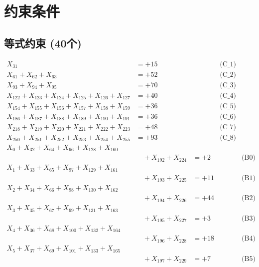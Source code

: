 \documentclass[a4paper,10pt]{article}
\begin{document}
\section{约束条件}

\subsection{等式约束 (40个)}

\allowdisplaybreaks
{\small
\begin{align}
X_{31} &= +15 && \text{(C\_1)} \\
X_{61} + X_{62} + X_{63} &= +52 && \text{(C\_2)} \\
X_{93} + X_{94} + X_{95} &= +70 && \text{(C\_3)} \\
X_{122} + X_{123} + X_{124} + X_{125} + X_{126} + X_{127} &= +40 && \text{(C\_4)} \\
X_{154} + X_{155} + X_{156} + X_{157} + X_{158} + X_{159} &= +36 && \text{(C\_5)} \\
\allowbreak
X_{186} + X_{187} + X_{188} + X_{189} + X_{190} + X_{191} &= +36 && \text{(C\_6)} \\
X_{218} + X_{219} + X_{220} + X_{221} + X_{222} + X_{223} &= +48 && \text{(C\_7)} \\
X_{250} + X_{251} + X_{252} + X_{253} + X_{254} + X_{255} &= +93 && \text{(C\_8)} \\
X_{0} + X_{32} + X_{64} + X_{96} + X_{128} + X_{160} \\[0.1ex]
&\quad  + X_{192} + X_{224} &= +2 && \text{(B0)} \\
X_{1} + X_{33} + X_{65} + X_{97} + X_{129} + X_{161} \\[0.1ex]
&\quad  + X_{193} + X_{225} &= +11 && \text{(B1)} \\
\allowbreak
X_{2} + X_{34} + X_{66} + X_{98} + X_{130} + X_{162} \\[0.1ex]
&\quad  + X_{194} + X_{226} &= +44 && \text{(B2)} \\
X_{3} + X_{35} + X_{67} + X_{99} + X_{131} + X_{163} \\[0.1ex]
&\quad  + X_{195} + X_{227} &= +3 && \text{(B3)} \\
X_{4} + X_{36} + X_{68} + X_{100} + X_{132} + X_{164} \\[0.1ex]
&\quad  + X_{196} + X_{228} &= +18 && \text{(B4)} \\
X_{5} + X_{37} + X_{69} + X_{101} + X_{133} + X_{165} \\[0.1ex]
&\quad  + X_{197} + X_{229} &= +7 && \text{(B5)} \\

\end{align}}
\end{document}
